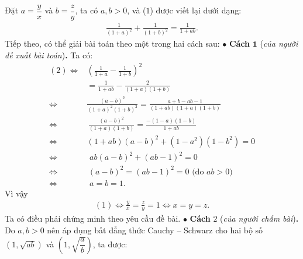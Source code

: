 \begin{multicols}{2}
	Đặt $a = \dfrac{y}{x}$  và  $b = \dfrac{z}{y}$, ta có $a, b > 0$, và ($1$) được viết lại dưới dạng:
	\begin{align*}
		\frac{1}{{{{\left( {1 + a} \right)}^2}}} + \frac{1}{{{{\left( {1 + b} \right)}^2}}} = \frac{1}{{1 + ab}}.\tag{$2$}
	\end{align*}
	Tiếp theo, có thể giải bài toán theo một trong hai cách sau:
	\vskip 0.05cm
	\columnbreak
	$\bullet$ \textbf{\color{thachthuctoanhoc}Cách} $\pmb{1}$ (\textit{của người đề xuất bài toán})\textbf{\color{thachthuctoanhoc}.}
	\vskip 0.05cm
	Ta có:
	\begin{align*}
		(2)\!\Leftrightarrow &{\left( {\frac{1}{{1 + a}} - \frac{1}{{1 + b}}} \right)^2} \\[-0.4ex]
		&= \frac{1}{{1 + ab}} - \frac{2}{{\left( {1 + a} \right)\left( {1 + b} \right)}}\\[-0.4ex]
		\Leftrightarrow &\frac{{{{\left( {a - b} \right)}^2}}}{{{{\left(\!{1 \!+\! a}\! \right)}^2}\!{{\left( \!{1 + b}\! \right)}^2}}} \!=\! \frac{{a + b - ab - 1}}{{\left(\! {1 \!+\! ab}\! \right)\!\left(\! {1 \!+\! a}\! \right)\!\left(\! {1 + b}\! \right)}}\\[-0.4ex]
		\Leftrightarrow&\, \frac{{{{\left( {a - b} \right)}^2}}}{{\left( {1 + a} \right)\left( {1 + b} \right)}}= \frac{{ - \left( {1 - a} \right)\left( {1 - b} \right)}}{{1 + ab}}\\[-0.4ex]
		\Leftrightarrow &\left( {1 \!+\! ab} \right)\!{\left( {a \!-\! b} \right)^2} \!+\! \left(\!\! {1 \!-\! {a^2}} \right)\!\!\left(\!\! {1 \!-\! {b^2}} \right) \!=\! 0\\[-0.4ex]
		\Leftrightarrow &\,\,ab{\left( {a - b} \right)^2} + {\left( {ab - 1} \right)^2} = 0\\[-0.4ex]
		\Leftrightarrow &\,{\left( {a - b} \right)^2} = {\left( {ab - 1} \right)^2} = 0 \text{ (do $ab>0$)}\\[-0.4ex]
		\Leftrightarrow &\,\,a = b = 1.
	\end{align*} 
	Vì vậy
	\begin{align*}
		(1) \Leftrightarrow \frac{y}{x} = \frac{z}{y} = 1 \Leftrightarrow x = y =z.
	\end{align*}
	Ta có điều phải chứng minh theo yêu cầu đề bài.
	\vskip 0.05cm
	$\bullet$ \textbf{\color{thachthuctoanhoc}Cách} $2$ (\textit{của người chấm bài})\textbf{\color{thachthuctoanhoc}.}
	\vskip 0.05cm
	Do $a, b > 0$ nên áp dụng bất đẳng thức Cauchy -- Schwarz cho hai bộ số  $(1,\sqrt{ab})$ và  $\left(1, \sqrt{\dfrac{a}{b}}\right)$, ta được:
	\begin{align*}

\end{align*}
\end{multicols}
